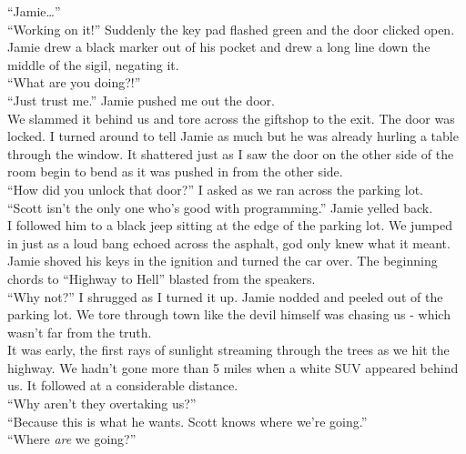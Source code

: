 \documentclass[a5paper]{scrartcl}
\begin{document}
\enquote{Jamie\dots }\\


\enquote{Working on it!} Suddenly the key pad flashed green and the door clicked open. Jamie drew a black marker out of his pocket and drew a long line down the middle of the sigil, negating it. \\


\enquote{What are you doing?!}\\


\enquote{Just trust me.} Jamie pushed me out the door.\\


We slammed it behind us and tore across the giftshop to the exit. The door was locked. I turned around to tell Jamie as much but he was already hurling a table through the window. It shattered just as I saw the door on the other side of the room begin to bend as it was pushed in from the other side.\\


\enquote{How did you unlock that door?} I asked as we ran across the parking lot.\\


\enquote{Scott isn't the only one who's good with programming.} Jamie yelled back. \\


I followed him to a black jeep sitting at the edge of the parking lot. We jumped in just as a loud bang echoed across the asphalt, god only knew what it meant. Jamie shoved his keys in the ignition and turned the car over. The beginning chords to \enquote{Highway to Hell} blasted from the speakers.\\


\enquote{Why not?} I shrugged as I turned it up. Jamie nodded and peeled out of the parking lot. We tore through town like the devil himself was chasing us - which wasn't far from the truth.\\


It was early, the first rays of sunlight streaming through the trees as we hit the highway. We hadn't gone more than 5 miles when a white SUV appeared behind us. It followed at a considerable distance.\\


\enquote{Why aren't they overtaking us?}\\


\enquote{Because this is what he wants. Scott knows where we're going.}\\


\enquote{Where \textit{are} we going?}\\
\end{document}
